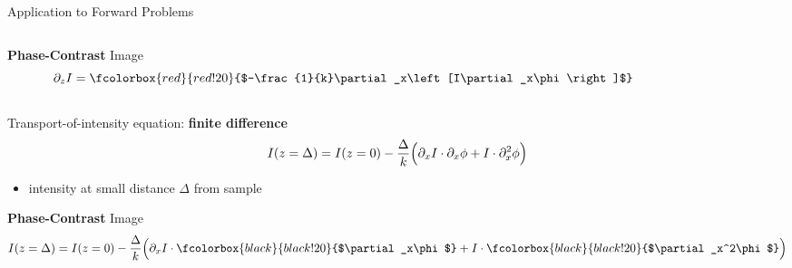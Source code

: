 \documentclass[
 ]{beamer}%
\begin{document}
\begin{frame}{Application to Forward Problems}
    \vspace{0.2cm}
    \begin{columns}
        \begin{column}{0.65\textwidth}
            \textbf{Phase-Contrast} Image
            \begin{equation*}
                \partial_z I=\fcolorbox{red}{red!20}{$-\frac{1}{k}\partial_x\left[I\partial_x\phi\right]$}
            \end{equation*}
        \end{column}
        \begin{column}{0.25\textwidth}
        
            \cylinder
        \end{column}
    \end{columns}
    
    \vspace{-0.8cm}
    Transport-of-intensity equation: \textbf{finite difference}
    \begin{equation*}
        I(z=\Delta)=I(z=0)-\frac{\Delta}{k}\Bigl(\partial_xI\cdot \partial_x\phi+I\cdot\partial_x^2\phi\Bigr)
    \end{equation*}
    \vspace{-0.45cm}
    \begin{itemize}
        \item intensity at small distance $\Delta$ from sample
    \end{itemize}
\end{frame}


\begin{frame}
    \textbf{Phase-Contrast} Image
    \begin{equation*}
        I(z=\Delta)=I(z=0)-\frac{\Delta}{k}\Bigl(\partial_xI\cdot\fcolorbox{black}{black!20}{$\partial_x\phi$}+I\cdot\fcolorbox{black}{black!20}{$\partial_x^2\phi$}\Bigr)
    \end{equation*}

    \begin{columns}
        \begin{column}{0.05\textwidth}
            \cylinder
        \end{column}
        \begin{column}{0.05\textwidth}
            \phase
        \end{column}
        \begin{column}{0.05\textwidth}
            \dphase
            
            \vspace{0.5cm}
            \dphasecontrast
        \end{column}
        \begin{column}{0.05\textwidth}
            \ddphase

            \vspace{0.5cm}
            \ddphasecontrast
        \end{column}
    \end{columns}
\end{frame}
\end{document}
